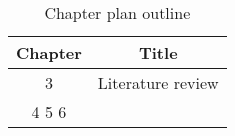 \begin{table}[h!]
\centering
\begin{tabular}{cc}
{Chapter} & {Title} \\ \midrule
{3} & {Literature review} \\
{4} 
{5}
{6}
\end{tabular}
\caption{Chapter plan outline}
\label{table:1}
\end{table}